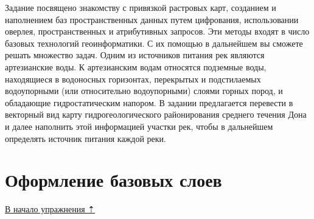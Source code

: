 \documentclass[]{book}
\theoremstyle{definition}
\theoremstyle{definition}
\theoremstyle{definition}
\theoremstyle{remark}
\begin{document}
Задание посвящено знакомству с привязкой растровых карт, созданием и
наполнением баз пространственных данных путем цифрования, использовании
оверлея, пространственных и атрибутивных запросов. Эти методы входят в
число базовых технологий геоинформатики. С их помощью в дальнейшем вы
сможете решать множество задач. Одним из источников питания рек являются
артезианские воды. К артезианским водам относятся подземные воды,
находящиеся в водоносных горизонтах, перекрытых и подстилаемых
водоупорными (или относительно водоупорными) слоями горных пород, и
обладающие гидростатическим напором. В задании предлагается перевести в
векторный вид карту гидрогеологического районирования среднего течения
Дона и далее наполнить этой информацией участки рек, чтобы в дальнейшем
определять источник питания каждой реки.

\hypertarget{map-ref-hydrogeologic-base}{%
\section{Оформление базовых слоев}\label{map-ref-hydrogeologic-base}}

\protect\hyperlink{map-ref-hydrogeologic}{В начало упражнения ⇡}
\end{document}
